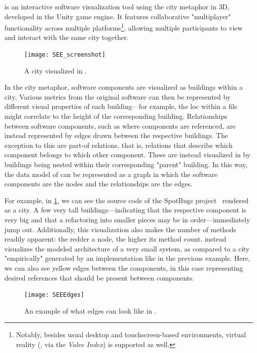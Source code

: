 \documentclass[../thesis]{subfiles}
\begin{document}
\SEE{} is an interactive software visualization tool using the \gls*{city} metaphor in 3D, developed in the {Unity} game engine.
It features collaborative "multiplayer" functionality across multiple platforms\footnote{
	Notably, besides usual desktop and touchscreen-based environments, virtual reality (\eg, via the \emph{Valve Index}) is supported as well.
}, allowing multiple participants to view and interact with the same \gls*{city} together.

\begin{figure}[hbtp]
	\centering
	\texttt{[image: SEE\_screenshot]}
	\caption{A \gls{city} visualized in \SEE{}.}\label{fig:city}
\end{figure}

In the \gls{city} metaphor, software components are visualized as buildings within a city.
Various metrics from the original software can then be represented by different visual properties of each building---for example, the \gls{loc} within a file might correlate to the height of the corresponding building.
Relationships between software components, such as where components are referenced, are instead represented by edges drawn between the respective buildings.
The exception to this are part-of relations, that is, relations that describe which component belongs to which other component.
These are instead visualized in \SEE{} by buildings being nested within their corresponding "parent" building.
In this way, the data model of \SEE{} can be represented as a graph in which the software components are the nodes and the relationships are the edges.

For example, in \cref{fig:city}, we can see the source code of the SpotBugs project~\cite{spotbugs} rendered as a \gls{city}.
A few very tall buildings---indicating that the respective component is very big and that a refactoring into smaller pieces may be in order---immediately jump out.
Additionally, this visualization also makes the number of methods readily apparent:
the redder a node, the higher its method count.
 instead visualizes the modeled architecture of a very small system, as compared to a city "empirically" generated by an implementation like in the previous example.
Here, we can also see yellow edges between the components, in this case representing desired references that should be present between components.

\begin{figure}[hbtp]
	\begin{center}
		\texttt{[image: SEEEdges]}
	\end{center}
	\caption{An example of what edges can look like in \SEE{}.}\label{fig:edges}
\end{figure}
\end{document}
